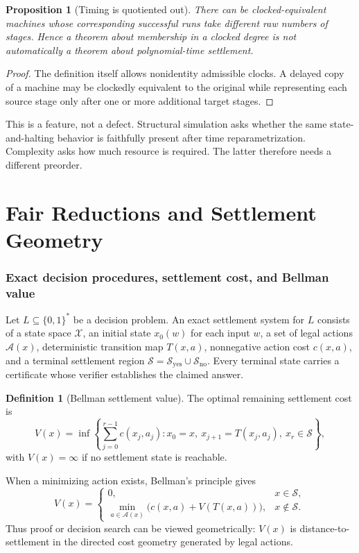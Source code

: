 \documentclass[11pt]{article}
\newtheorem{proposition}[theorem]{Proposition}
\theoremstyle{definition}
\newtheorem{definition}[theorem]{Definition}
\begin{document}
\begin{proposition}[Timing is quotiented out]
There can be clocked-equivalent machines whose corresponding successful runs take different raw numbers of stages. Hence a theorem about membership in a clocked degree is not automatically a theorem about polynomial-time settlement.
\end{proposition}

\begin{proof}
The definition itself allows nonidentity admissible clocks. A delayed copy of a machine may be clockedly equivalent to the original while representing each source stage only after one or more additional target stages.
\end{proof}

This is a feature, not a defect. Structural simulation asks whether the same state-and-halting behavior is faithfully present after time reparametrization. Complexity asks how much resource is required. The latter therefore needs a different preorder.

\part{Fair Reductions and Settlement Geometry}

\section{Exact decision procedures, settlement cost, and Bellman value}
Let $L\subseteq\{0,1\}^*$ be a decision problem. An exact settlement system for $L$ consists of a state space $\mathcal X$, an initial state $x_0(w)$ for each input $w$, a set of legal actions $\mathcal A(x)$, deterministic transition map $T(x,a)$, nonnegative action cost $c(x,a)$, and a terminal settlement region $\mathcal S=\mathcal S_{\mathrm{yes}}\cup\mathcal S_{\mathrm{no}}$. Every terminal state carries a certificate whose verifier establishes the claimed answer.

\begin{definition}[Bellman settlement value]
The optimal remaining settlement cost is
\[
V(x)=\inf\left\{\sum_{j=0}^{r-1}c(x_j,a_j):
 x_0=x,\ x_{j+1}=T(x_j,a_j),\ x_r\in\mathcal S\right\},
\]
with $V(x)=\infty$ if no settlement state is reachable.
\end{definition}

When a minimizing action exists, Bellman's principle gives~\cite{Bellman1957}
\[
V(x)=
\begin{cases}
0,&x\in\mathcal S,\\[3pt]
\displaystyle\min_{a\in\mathcal A(x)}\bigl(c(x,a)+V(T(x,a))\bigr),&x\notin\mathcal S.
\end{cases}
\]
Thus proof or decision search can be viewed geometrically: $V(x)$ is distance-to-settlement in the directed cost geometry generated by legal actions.
\end{document}

